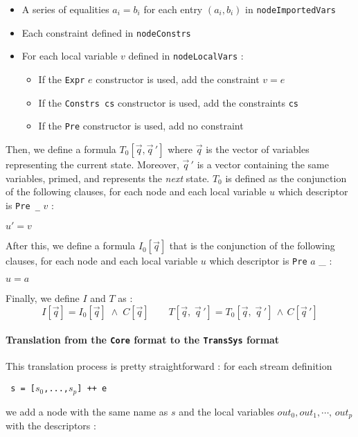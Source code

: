 \begin{itemize}
\item A series of equalities $a_i = b_i$ for each entry $(a_i, b_i)$ in \texttt{nodeImportedVars}
\item Each constraint defined in \texttt{nodeConstrs}
\item For each local variable $v$ defined in \texttt{nodeLocalVars} :

\begin{itemize}
\item If the \texttt{Expr} $e$ constructor is used, add the constraint $v = e$
\item If the \texttt{Constrs cs} constructor is used, add the constraints \texttt{cs} 
\item If the \texttt{Pre} constructor is used, add no constraint
\end{itemize}

\end{itemize}


Then, we define a formula $T_0[\vec q, \vec q \,']$ where $\vec q$ is the vector of variables representing the current state. Moreover, $\vec q \,'$ is a vector containing the same variables, primed, and represents the \textit{next} state. $T_0$ is defined as the conjunction of the following clauses, for each node and each local variable $u$ which descriptor is \texttt{Pre \_} $v$ :
\begin{center} $u' = v$ \end{center}
After this, we define a formula $I_0[\vec q]$ that  is the conjunction of the following clauses, for each node and each local variable $u$ which descriptor is \texttt{Pre} $a$ \_ :
\begin{center} $u = a$ \end{center}
Finally, we define $I$ and $T$ as :
\[  I[\vec q] =  I_0[\vec q] \;\wedge\; C[\vec q] \qquad T[\vec q, \; \vec q \, '] = T_0[\vec q, \; \vec q \,'] \, \wedge \, C[\vec q \, ']  \]




\paragraph{Translation from the \texttt{Core} format to the \texttt{TransSys} format}

This translation process is pretty straightforward : for each stream definition
\begin{center}\texttt{ s = [$s_0$,...,$s_p$] ++ e}\end{center}
we add a node with the same name as $s$ and the local variables $out_0, out_1, \cdots, \, out_p$ with the descriptors :

